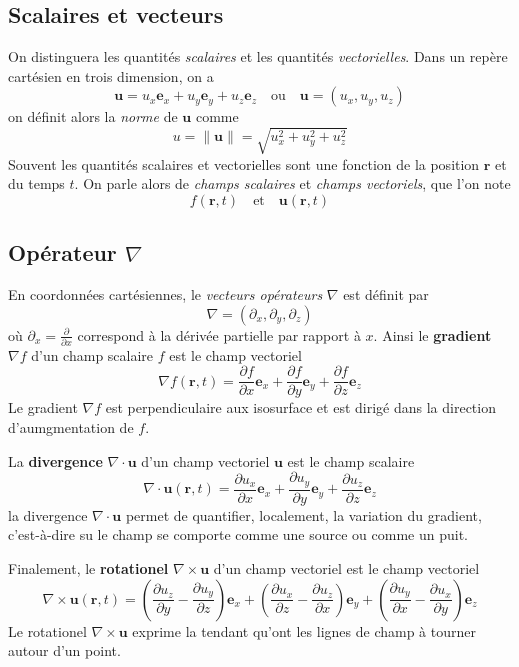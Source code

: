\documentclass[10pt]{article}
\numberwithin{equation}{section}
\newcommand{\norme}[1]{ \left\| #1 \right\|}
\newcommand{\et}{\quad \text{et} \quad}
\newcommand{\ou}{\quad \text{ou} \quad}
\begin{document}
	\subsection{Scalaires et vecteurs}
	On distinguera les quantités \emph{scalaires} et les quantités \emph{vectorielles}. Dans un repère cartésien en trois dimension, on a
	\[
	\bm u = u_x \bm e_x + u_y \bm e_y + u_z \bm e_z \ou \bm u = (u_x, u_y, u_z)
	\]
	on définit alors la \emph{norme} de $\bm u$ comme 
	\[
	u = \norme{\bm u} = \sqrt{u_x^2 + u_y^2 + u_z^2} 
	\]
	Souvent les quantités scalaires et vectorielles sont une fonction de la position $\bm r$ et du temps $t$. On parle alors de \emph{champs scalaires} et \emph{champs vectoriels}, que l'on note
	\[
	f(\bm r, t) \et \bm u(\bm r, t)
	\]
	\subsection{Opérateur $\nabla$}
	En coordonnées cartésiennes, le \emph{vecteurs opérateurs} $\nabla$ est définit par
	\[
	\nabla = (\partial_x, \partial_y, \partial_z)
	\]
	où $\partial_x = \frac{\partial}{\partial x}$ correspond à la dérivée partielle par rapport à $x$. Ainsi le \textbf{gradient} $\nabla f$ d'un champ scalaire $f$ est le champ vectoriel
	\[
	\boxed{\nabla f(\bm r, t) = \frac{\partial f}{\partial x} \bm e_x + \frac{\partial f }{\partial y} \bm e_y + \frac{\partial f}{\partial z} \bm e_z}
	\]
	Le gradient $\nabla f$ est perpendiculaire aux isosurface et est dirigé dans la direction d'aumgmentation de $f$.
	
	La \textbf{divergence} $\nabla \cdot \bm u$ d'un champ vectoriel $\bm u$ est le champ scalaire
	\[
	\boxed{\nabla \cdot \bm u( \bm r, t) = \frac{\partial u_x}{\partial x} \bm e_x + \frac{\partial u_y}{\partial y} \bm e_y + \frac{\partial u_z}{\partial z} \bm e_z}
	\]
	la divergence $\nabla \cdot \bm u$ permet de quantifier, localement, la variation du gradient, c'est-à-dire su le champ se comporte comme une source ou comme un puit.
	
	Finalement, le \textbf{rotationel} $\nabla \times \bm u$ d'un champ vectoriel est le champ vectoriel
	\[
	\boxed{
	\nabla \times \bm u(\bm r, t) = \left(\frac{\partial u_z}{\partial y} - \frac{\partial u_y}{\partial z} \right) \bm e_x + \left( \frac{\partial u_x}{\partial z} - \frac{\partial u_z}{\partial x} \right) \bm e_y + \left( \frac{\partial u_y}{\partial x } - \frac{\partial u_x}{\partial y} \right) \bm e_z}
	\]
	Le rotationel $\nabla \times \bm u$ exprime la tendant qu'ont les lignes de champ à tourner autour d'un point.
	
\end{document}
